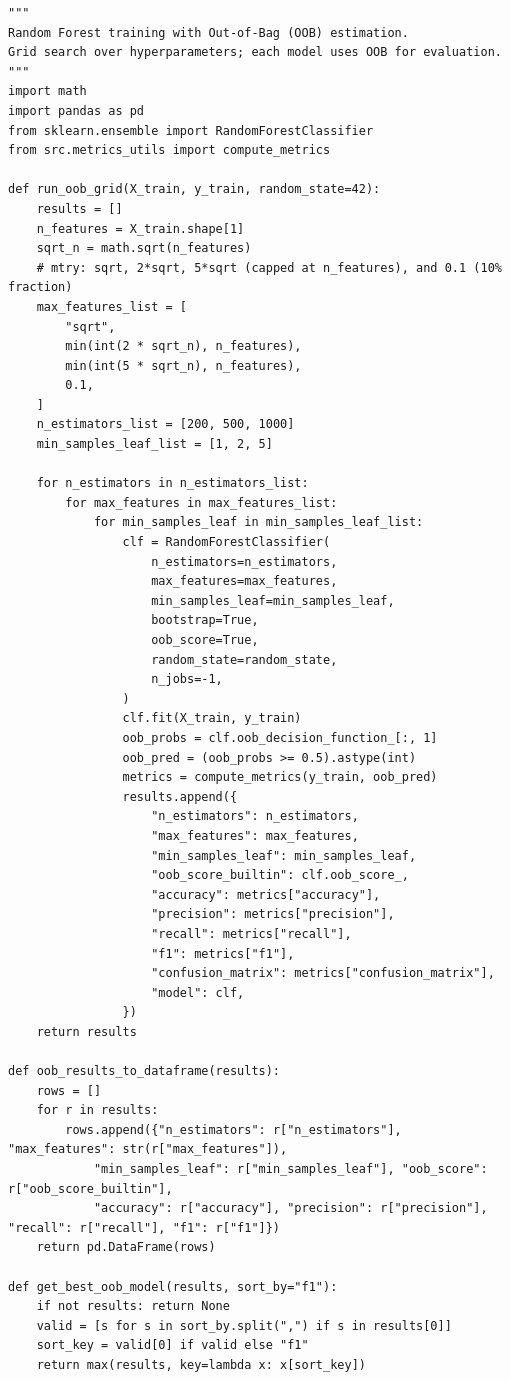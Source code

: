 \documentclass[11pt]{article}
\begin{document}
\begin{lstlisting}[style=pythonstyle]
"""
Random Forest training with Out-of-Bag (OOB) estimation.
Grid search over hyperparameters; each model uses OOB for evaluation.
"""
import math
import pandas as pd
from sklearn.ensemble import RandomForestClassifier
from src.metrics_utils import compute_metrics

def run_oob_grid(X_train, y_train, random_state=42):
    results = []
    n_features = X_train.shape[1]
    sqrt_n = math.sqrt(n_features)
    # mtry: sqrt, 2*sqrt, 5*sqrt (capped at n_features), and 0.1 (10% fraction)
    max_features_list = [
        "sqrt",
        min(int(2 * sqrt_n), n_features),
        min(int(5 * sqrt_n), n_features),
        0.1,
    ]
    n_estimators_list = [200, 500, 1000]
    min_samples_leaf_list = [1, 2, 5]

    for n_estimators in n_estimators_list:
        for max_features in max_features_list:
            for min_samples_leaf in min_samples_leaf_list:
                clf = RandomForestClassifier(
                    n_estimators=n_estimators,
                    max_features=max_features,
                    min_samples_leaf=min_samples_leaf,
                    bootstrap=True,
                    oob_score=True,
                    random_state=random_state,
                    n_jobs=-1,
                )
                clf.fit(X_train, y_train)
                oob_probs = clf.oob_decision_function_[:, 1]
                oob_pred = (oob_probs >= 0.5).astype(int)
                metrics = compute_metrics(y_train, oob_pred)
                results.append({
                    "n_estimators": n_estimators,
                    "max_features": max_features,
                    "min_samples_leaf": min_samples_leaf,
                    "oob_score_builtin": clf.oob_score_,
                    "accuracy": metrics["accuracy"],
                    "precision": metrics["precision"],
                    "recall": metrics["recall"],
                    "f1": metrics["f1"],
                    "confusion_matrix": metrics["confusion_matrix"],
                    "model": clf,
                })
    return results

def oob_results_to_dataframe(results):
    rows = []
    for r in results:
        rows.append({"n_estimators": r["n_estimators"], "max_features": str(r["max_features"]),
            "min_samples_leaf": r["min_samples_leaf"], "oob_score": r["oob_score_builtin"],
            "accuracy": r["accuracy"], "precision": r["precision"], "recall": r["recall"], "f1": r["f1"]})
    return pd.DataFrame(rows)

def get_best_oob_model(results, sort_by="f1"):
    if not results: return None
    valid = [s for s in sort_by.split(",") if s in results[0]]
    sort_key = valid[0] if valid else "f1"
    return max(results, key=lambda x: x[sort_key])
\end{lstlisting}
\end{document}
